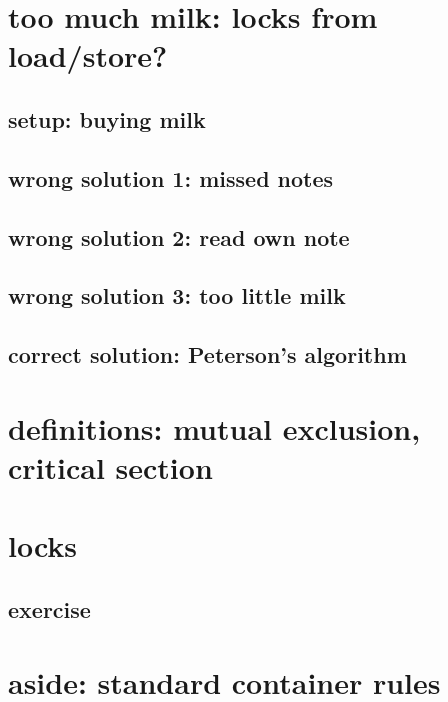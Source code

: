 

\section{too much milk: locks from load/store?}

\subsection{setup: buying milk}


\subsection{wrong solution 1: missed notes}


\subsection{wrong solution 2: read own note}


\subsection{wrong solution 3: too little milk}


\subsection{correct solution: Peterson's algorithm}


\section{definitions: mutual exclusion, critical section}



\section{locks}


\subsection{exercise}


\section{aside: standard container rules}


